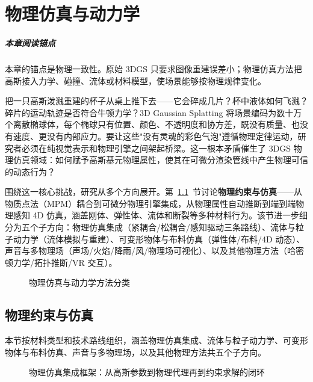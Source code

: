 \chapter{物理仿真与动力学}
\label{ch:07}

\paragraph*{本章阅读锚点}
本章的锚点是物理一致性。原始 3DGS 只要求图像重建误差小；物理仿真方法把高斯接入力学、碰撞、流体或材料模型，使场景能够按物理规律变化。


把一只高斯泼溅重建的杯子从桌上推下去——它会碎成几片？杯中液体如何飞溅？碎片的运动轨迹是否符合牛顿力学？3D Gaussian Splatting 将场景编码为数十万个离散椭球体，每个椭球只有位置、颜色、不透明度和协方差，既没有质量、也没有速度、更没有内部应力。要让这些"没有灵魂的彩色气泡"遵循物理定律运动，研究者必须在纯视觉表示和物理引擎之间架起桥梁。这一根本矛盾催生了 3DGS 物理仿真领域：如何赋予高斯基元物理属性，使其在可微分渲染管线中产生物理可信的动态行为？

围绕这一核心挑战，研究从多个方向展开。第~\ref{sec:07_1}~节讨论\textbf{物理约束与仿真}——从物质点法（MPM）耦合到可微分物理引擎集成，从物理属性自动推断到端到端物理感知 4D 仿真，涵盖刚体、弹性体、流体和断裂等多种材料行为。该节进一步细分为五个子方向：物理仿真集成（紧耦合/松耦合/感知驱动三条路线）、流体与粒子动力学（流体模拟与重建）、可变形物体与布料仿真（弹性体/布料/4D 动态）、声音与多物理场（声场/火焰/降雨/风/物理场可视化）、以及其他物理方法（哈密顿力学/拓扑推断/VR 交互）。

\begin{figure}[htbp]
\centering
\resizebox{\textwidth}{!}{}
\caption{物理仿真与动力学方法分类}
\label{fig:ch07_physics_taxonomy}
\end{figure}

\section{物理约束与仿真}
\label{sec:07_1}

本节按材料类型和技术路线组织，涵盖物理仿真集成、流体与粒子动力学、可变形物体与布料仿真、声音与多物理场，以及其他物理方法共五个子方向。

\begin{figure}[htbp]
\centering
\resizebox{\textwidth}{!}{}
\caption{物理仿真集成框架：从高斯参数到物理代理再到约束求解的闭环}
\label{fig:ch07_physics_sim}
\end{figure}

